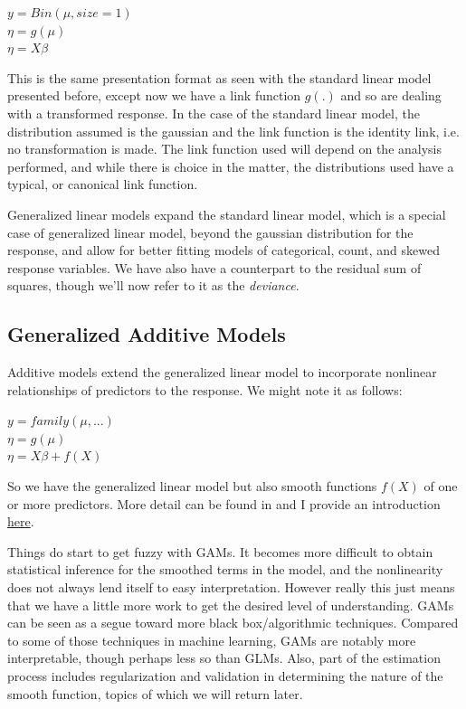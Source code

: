 \documentclass[english,nohyper,titlepage]{tufte-handout}
\begin{document}
\vspace{.25cm}
\noindent$y = Bin(\mu, size=1)$\\
\noindent$\eta = g(\mu)$\\
\noindent$\eta = X\beta$\\
\vspace{.25cm}

This is the same presentation format as seen with the standard linear model presented before, except now we have a link function $g(.)$ and so are dealing with a transformed response.  In the case of the standard linear model, the distribution assumed is the gaussian and the link function is the identity link, i.e. no transformation is made. The link function used will depend on the analysis performed, and while there is choice in the matter, the distributions used have a typical, or canonical link function.

Generalized linear models expand the standard linear model, which is a special case of generalized linear model, beyond the gaussian distribution for the response, and allow for better fitting models of categorical, count, and skewed response variables.  We have also have a counterpart to the residual sum of squares, though we'll now refer to it as the \emph{deviance}.

\subsection{Generalized Additive Models}
Additive models extend the generalized linear model to incorporate nonlinear relationships of predictors to the response. We might note it as follows:

\vspace{.25cm}
\noindent$y = family(\mu, ...)$\\
\noindent$\eta = g(\mu)$\\
\noindent$\eta = X\beta + f(X)$\\
\vspace{.25cm}

So we have the generalized linear model but also smooth functions $f(X)$ of one or more predictors.  More detail can be found in \citet{wood_generalized_2006} and I provide an introduction \href{http://www.nd.edu/~mclark19/learn/GAMS.pdf}{here}.  

Things do start to get fuzzy with GAMs.  It becomes more difficult to obtain statistical inference for the smoothed terms in the model, and the nonlinearity does not always lend itself to easy interpretation.  However really this just means that we have a little more work to get the desired level of understanding.  GAMs can be seen as a segue toward more black box/algorithmic techniques.  Compared to some of those techniques in machine learning, GAMs are notably more interpretable, though perhaps less so than GLMs.  Also, part of the estimation process includes regularization and validation in determining the nature of the smooth function, topics of which we will return later.
\end{document}
